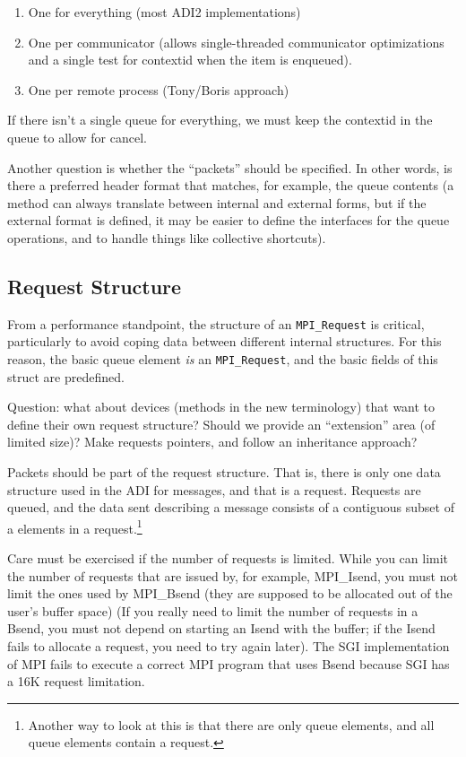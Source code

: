 \documentclass{article}
\begin{document}
\begin{enumerate}
\item One for everything (most ADI2 implementations)
\item One per communicator (allows single-threaded communicator optimizations
  and a single test for contextid when the item is enqueued).
\item One per remote process (Tony/Boris approach)
\end{enumerate}

If there isn't a single queue for everything, we must keep the contextid in
the queue to allow for cancel.

Another question is whether the ``packets'' should be specified.  In other
words, is there a preferred header format that matches, for example, the queue
contents (a method can always translate between internal and external forms,
but if the external format is defined, it may be easier to define the
interfaces for the queue operations, and to handle things like collective
shortcuts).

\subsection{Request Structure}
From a performance standpoint, the structure of an \texttt{MPI\_Request} is
critical, particularly to avoid coping data between different internal
structures.  For this reason, the basic queue element \emph{is} an
\texttt{MPI\_Request}, and the basic fields of this struct are predefined.

Question: what about devices (methods in the new terminology) that want to
define their own request structure? 
Should we provide an ``extension'' area (of limited size)?  Make requests
pointers, and follow an inheritance approach?  

Packets should be part of the request structure.  That is, there is only one
data structure used in the ADI for messages, and that is a request.  Requests
are queued, and the data sent describing a message consists of a contiguous
subset of a elements in a request.\footnote{Another way to look at this is
  that there are only queue elements, and all queue elements contain a
  request.} 

Care must be exercised if the number of requests is limited.
While you can limit
the number of requests that are issued by, for example, MPI\_Isend, you must
not limit the ones used by MPI\_Bsend (they are supposed to be allocated out
of the user's buffer space) (If you really need to limit the number of
requests in a Bsend, you must not depend on starting an Isend with the buffer;
if the Isend fails to allocate a request, you need to try again later).  The
SGI implementation of MPI fails to execute a correct MPI program that uses
Bsend because SGI has a 16K request limitation.
\end{document}
